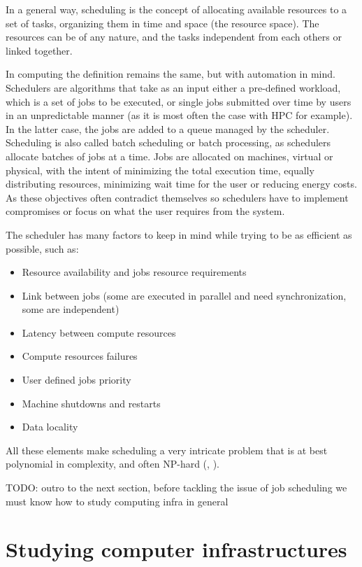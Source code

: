 \documentclass[12pt, a4paper]{memoir}
\begin{document}
In a general way, scheduling is the concept of allocating available resources
to a set of tasks, organizing them in time and space (the resource space). The
resources can be of any nature, and the tasks independent from each others or
linked together.

In computing the definition remains the same, but with automation in mind.
Schedulers are algorithms that take as an input either a pre-defined workload,
which is a set of jobs  to be executed, or single jobs submitted over time by
users in an unpredictable manner (as it is most often the case with HPC for
example). In the latter case, the jobs are added to a queue managed by the
scheduler. Scheduling is also called batch scheduling or batch processing, as
schedulers allocate batches of jobs at a time. Jobs are allocated on machines,
virtual or physical, with the intent of minimizing the total execution time,
equally distributing resources, minimizing wait time for the user or reducing
energy costs. As these objectives often contradict themselves so schedulers have
to implement compromises or focus on what the user requires from the system.

The scheduler has many factors to keep in mind while trying to be as efficient
as possible, such as:

\begin{itemize}
	\item Resource availability and jobs resource requirements
	\item Link between jobs (some are executed in parallel and need synchronization, some are independent)
	\item Latency between compute resources
	\item Compute resources failures
	\item User defined jobs priority
	\item Machine shutdowns and restarts
	\item Data locality
\end{itemize}

All these elements make scheduling a very intricate problem that is at best
polynomial in complexity, and often NP-hard (\cite{10.1016/S0022-0000(75)80008-0}, \cite{scheduler-complexity}).

TODO: outro to the next section, before tackling the issue of job scheduling we
must know how to study computing infra in general

\section{Studying computer infrastructures} \label{study-computing-infra}
\end{document}
